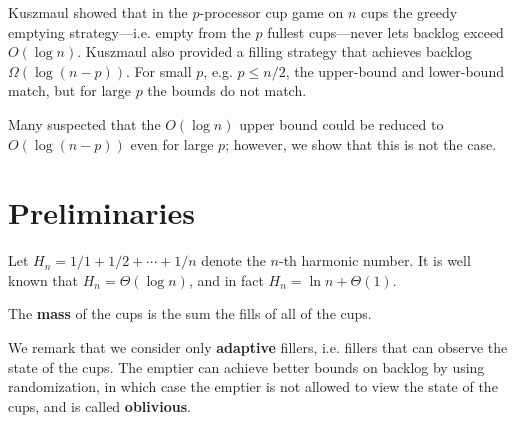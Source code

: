 \documentclass[11pt]{article}
\begin{document}
Kuszmaul showed that in the $p$-processor cup game on
$n$ cups the greedy emptying strategy---i.e. empty from the $p$
fullest cups---never lets backlog exceed $O(\log n)$. 
Kuszmaul also provided a filling strategy that achieves
backlog $\Omega(\log (n-p))$. 
For small $p$, e.g. $p \le n/2$, the upper-bound and lower-bound
match, but for large $p$ the bounds do not match. 

Many suspected that the $O(\log n)$ upper bound could be reduced
to $O(\log(n-p))$ even for large $p$; however, we show that this
is not the case.  

\section{Preliminaries}
Let $H_n = 1/1+1/2+\cdots +1/n$ denote the $n$-th harmonic
number. It is well known that $H_n = \Theta(\log n)$, and in fact
$H_n = \ln n + \Theta(1)$.

The \textbf{mass} of the cups is the sum the fills of all of the cups.

We remark that we consider only \textbf{adaptive} fillers, i.e. fillers
that can observe the state of the cups. The emptier can achieve
better bounds on backlog by using randomization, in which case
the emptier is not allowed to view the state of the cups, and is
called \textbf{oblivious}.
\end{document}
